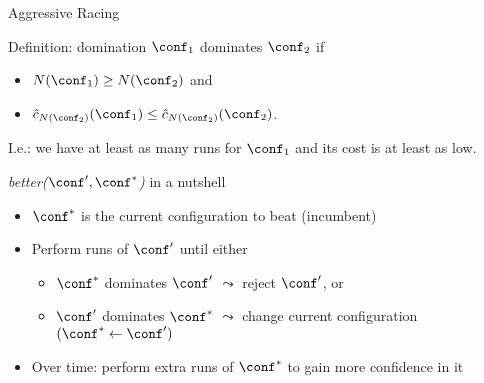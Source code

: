 \begin{frame}[c,fragile]{Aggressive Racing}


\begin{block}{Definition: domination}
\alert{$\conf_1$ dominates $\conf_2$} if 
\begin{itemize}
\item $N(\conf_1) \ge N(\conf_2)$ and 
\item $\hat{c}_{N(\conf_2)}(\conf_1) \le \hat{c}_{N(\conf_2)}(\conf_2)$.
\end{itemize}
I.e.: we have at least as many runs for $\conf_1$ and its cost is at least as low.
\end{block}

\pause

\begin{block}{\textit{better($\conf', \conf^*$)} in a nutshell}
\begin{itemize}
\item $\conf^*$ is the current configuration to beat (incumbent)
\pause
\item Perform runs of $\conf'$ until either
\begin{itemize}
\item $\conf^*$ dominates $\conf'$ $\leadsto$ reject $\conf'$, or
\item $\conf'$ dominates $\conf^*$ $\leadsto$ change current configuration $(\conf^* \leftarrow \conf')$
\end{itemize}
\pause	
\item Over time: perform extra runs of $\conf^*$ to gain more confidence in it
\end{itemize}
\end{block}

\end{frame}



